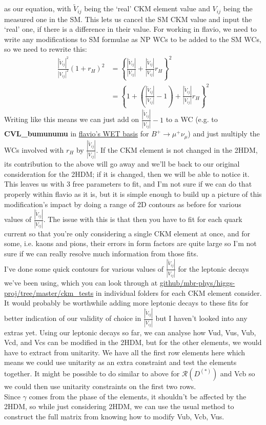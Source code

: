 \documentclass[11pt]{article}
\newcommand{\tVVt}{\frac{|\tilde{V}_{ij}|^2}{|V_{ij}|^2}}
\newcommand{\tVV}{\frac{|\tilde{V}_{ij}|}{|V_{ij}|}}
\begin{document}
as our equation, with $\tilde{V}_{ij}$ being the `real' CKM element value and $V_{ij}$ being the measured one in the SM.
This lets us cancel the SM CKM value and input the `real' one, if there is a difference in their value.
For working in flavio, we need to write any modifications to SM formulae as NP WCs to be added to the SM WCs, so we need to rewrite this:
    \begin{align*}
        \tVVt(1+r_H)^2 &= \left\{\tVV+\tVV r_H\right\}^2 \\
                       &= \left\{1+\left(\tVV-1\right)+\tVV r_H\right\}^2
    \end{align*}
Writing like this means we can just add on $\tVV-1$ to a WC (e.g. to \textbf{CVL\_bumunumu} in \href{https://wcxf.github.io/assets/pdf/WET.flavio.pdf}{flavio's WET basis} for $B^+\to\mu^+\nu_\mu$) and just multiply the WCs involved with $r_H$ by $\tVV$.
If the CKM element is not changed in the 2HDM, its contribution to the above will go away and we'll be back to our original consideration for the 2HDM; if it is changed, then we will be able to notice it.
This leaves us with 3 free parameters to fit, and I'm not sure if we can do that properly within flavio as it is, but it is simple enough to build up a picture of this modification's impact by doing a range of 2D contours as before for various values of $\tVV$.
The issue with this is that then you have to fit for each quark current so that you're only considering a single CKM element at once, and for some, i.e. kaons and pions, their errors in form factors are quite large so I'm not sure if we can really resolve much information from those fits.\\
I've done some quick contours for various values of $\tVV$ for the leptonic decays we've been using, which you can look through at \href{https://github.com/mbr-phys/higgs-proj/tree/master/ckm_tests}{github/mbr-phys/higgs-proj/tree/master/ckm\_tests} in individual folders for each CKM element consider.\\
It would probably be worthwhile adding more leptonic decays to these fits for better indication of our validity of choice in $\tVV$ but I haven't looked into any extras yet.
Using our leptonic decays so far, we can analyse how Vud, Vus, Vub, Vcd, and Vcs can be modified in the 2HDM, but for the other elements, we would have to extract from unitarity.
We have all the first row elements here which means we could use unitarity as an extra constraint and test the elements together.
It might be possible to do similar to above for $\mathcal{R}(D^{(*)})$ and Vcb so we could then use unitarity constraints on the first two rows.\\
Since $\gamma$ comes from the phase of the elements, it shouldn't be affected by the 2HDM, so while just considering 2HDM, we can use the usual method to construct the full matrix from knowing how to modify Vub, Vcb, Vus.
\end{document}
